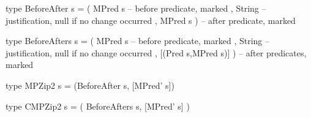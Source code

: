 \begin{code}
type BeforeAfter s
 = ( MPred s   -- before predicate, marked
   , String      -- justification, null if no change occurred
   , MPred s ) -- after predicate, marked
\end{code}

\begin{code}
type BeforeAfters s
 = ( MPred s   -- before predicate, marked
   , String      -- justification, null if no change occurred
   , [(Pred s,MPred s)] ) -- after predicates, marked
\end{code}


\begin{code}
type MPZip2 s = (BeforeAfter s, [MPred' s])
\end{code}


\begin{code}
type CMPZip2 s = ( BeforeAfters s, [MPred' s] )
\end{code}
